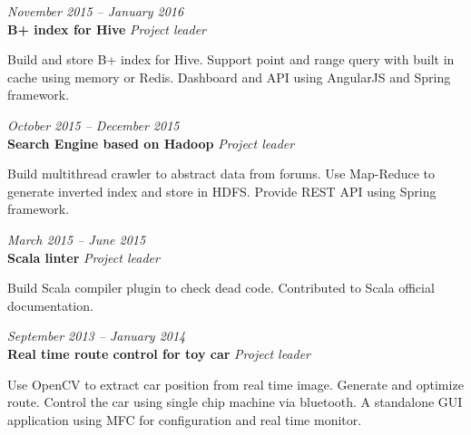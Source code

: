\documentclass[fontsize=10pt]{tccv}
\begin{document}
\begin{eventlist}


\textit{November 2015 -- January 2016} \\
\textbf{B+ index for Hive} \textit{Project leader}\smallskip

Build and store B+ index for Hive.
Support point and range query with built in cache using memory or Redis.
Dashboard and API using AngularJS and Spring framework.

\medskip

\textit{October 2015 -- December 2015} \\
\textbf{Search Engine based on Hadoop} \textit{Project leader}\smallskip

Build multithread crawler to abstract data from forums.
Use Map-Reduce to generate inverted index and store in HDFS.
Provide REST API using Spring framework.

\medskip

\textit{March 2015 -- June 2015} \\
\textbf{Scala linter} \textit{Project leader}\smallskip

Build Scala compiler plugin to check dead code.
Contributed to Scala official documentation.

\medskip


\textit{September 2013 -- January 2014} \\
\textbf{Real time route control for toy car} \textit{Project leader}\smallskip

Use OpenCV to extract car position from real time image.
Generate and optimize route.
Control the car using single chip machine via bluetooth.
A standalone GUI application using MFC for configuration and
real time monitor.


\end{eventlist}
\end{document}
